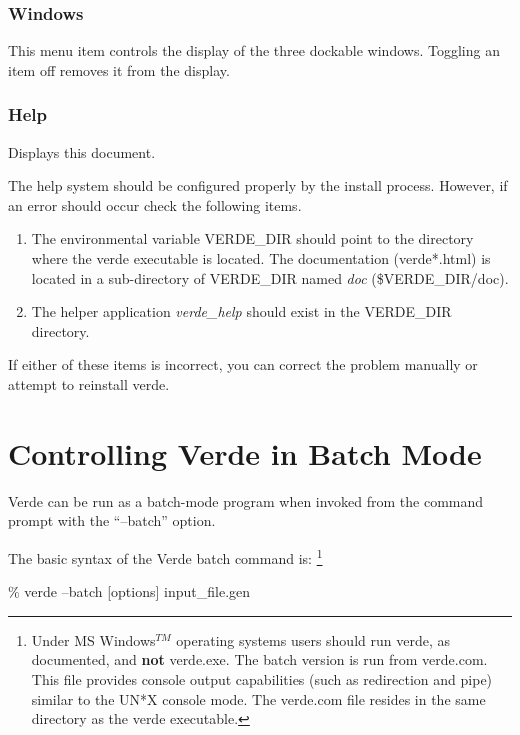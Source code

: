 \documentclass[10pt]{report}
\begin{document}
\subsection{Windows}
\label{windows}

This menu item controls the display of the three dockable windows.  Toggling
an item off removes it from the display.

\subsection{Help}
\label{help}

Displays this document.

The help system should be configured properly by the install
process.  However, if an error should occur check the following
items.

\begin{enumerate}
  \item The environmental variable VERDE\_DIR should point to the
	directory where the verde executable is located.  The 
	documentation (verde*.html) is located in a
	sub-directory  of VERDE\_DIR named {\it doc} (\$VERDE\_DIR/doc).
  \item The helper application {\it verde\_help} should exist in the
	VERDE\_DIR directory.
\end{enumerate}

If either of these items is incorrect, you can correct the problem
manually or attempt to reinstall verde.

\chapter{Controlling Verde in Batch Mode} 
\label{sec:batch}


Verde can be run as a batch-mode program when invoked from the command 
prompt with the ``--batch'' option.

The basic syntax of the Verde batch command is:
\footnote %
{
Under MS Windows$^{TM}$ operating systems users should run verde, as
documented, and {\bf not} verde.exe.  The batch version is 
run from verde.com.  This file provides console output
capabilities (such as redirection and pipe) similar to the UN*X
console mode.  The verde.com file resides in the
same directory as the verde executable.
}


\begin{center}

\% verde --batch [options] input\_file.gen
\end{center}
\end{document}
